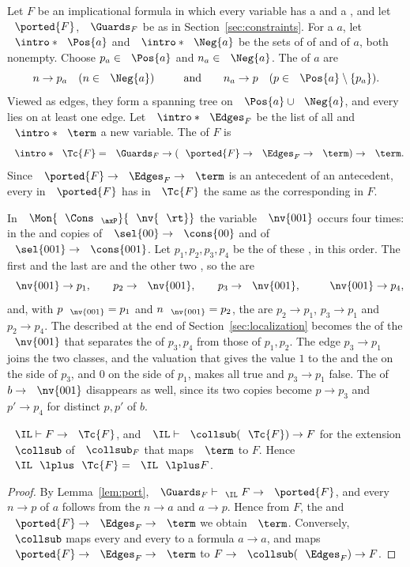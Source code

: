Let $F$ be an implicational formula in which every variable has a
 and a  , and let $\ported{F}$,
$\Guards_F$ be as in Section~\ref{sec:constraints}. \AP For a 
$a$, let $\intro*\Pos{a}$ and $\intro*\Neg{a}$ be the sets of  of
 and   of $a$, both nonempty.
Choose $p_a\in\Pos{a}$ and $n_a\in\Neg{a}$. The  of
$a$ are
\[
n\to p_a\quad(n\in\Neg{a})
\qquad\text{and}\qquad
n_a\to p\quad(p\in\Pos{a}\setminus\{p_a\}).
\]
Viewed as edges, they form a spanning tree on $\Pos{a}\cup\Neg{a}$, and
every  lies on at least one edge. \AP Let $\intro*\Edges_F$ be the
list of all  and $\intro*\term$ a new variable. The
 of $F$ is
\[
\intro*\Tc{F}=\Guards_F\to(\ported{F}\to\Edges_F\to\term)\to\term .
\]
Since $\ported{F}\to\Edges_F\to\term$ is an antecedent of an antecedent,
every  in $\ported{F}$ has in $\Tc{F}$ the same
 as the corresponding  in $F$.

\begin{example}\label{ex:P-ports}
In $\Mon{\Cons_{\axP}}{\nv{\rt}}$ the variable $\nv{001}$ occurs four times:
in the  and  copies of $\sel{00}\to\cons{00}$ and of
$\sel{001}\to\cons{001}$. Let $p_1,p_2,p_3,p_4$ be the  of these
, in this order. The first and the last are 
and the other two , so the  are
\[
\nv{001}\to p_1,\qquad p_2\to\nv{001},\qquad p_3\to\nv{001},\qquad
\nv{001}\to p_4,
\]
and, with $p_{\nv{001}}=p_1$ and $n_{\nv{001}}=p_2$, the 
are $p_2\to p_1$, $p_3\to p_1$ and $p_2\to p_4$. The 
described at the end of Section~\ref{sec:localization} becomes the
 of the  $\nv{001}$ that separates the 
of $p_3,p_4$ from those of $p_1,p_2$. The edge $p_3\to p_1$ joins the two
classes, and the valuation that gives the value $1$ to the 
 and the  on the side of $p_3$, and $0$ on the side
of $p_1$, makes all  true and $p_3\to p_1$ false. The
 of $b\to\nv{001}$ disappears as well, since its two
copies become $p\to p_3$ and $p'\to p_4$ for distinct  $p,p'$ of
$b$.
\end{example}

\begin{lemma}\label{lem:M-equiv}
$\IL\vdash F\to\Tc{F}$, and $\IL\vdash\collsub(\Tc{F})\to F$ for the
extension $\collsub$ of $\collsub_F$ that maps $\term$ to $F$. Hence
$\IL\lplus\Tc{F}=\IL\lplus F$.
\end{lemma}
\begin{proof}
By Lemma~\ref{lem:port}, $\Guards_F\vdash_{\IL}F\to\ported{F}$, and every
 $n\to p$ of $a$ follows from the  $n\to a$ and
$a\to p$. Hence from $F$, the  and $\ported{F}\to\Edges_F\to\term$
we obtain $\term$. Conversely, $\collsub$ maps every  and every
 to a formula $a\to a$, and maps
$\ported{F}\to\Edges_F\to\term$ to $F\to\collsub(\Edges_F)\to F$.
\end{proof}

